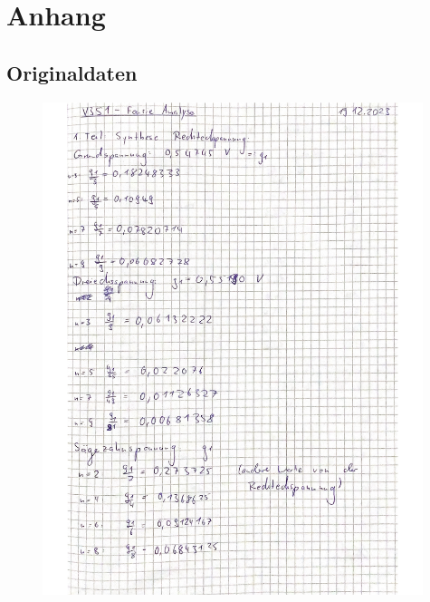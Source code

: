 \section{Anhang}
\label{sec:Anhang}
\subsection{Originaldaten}

 \begin{figure}[H]
   \centering
   \includegraphics[width=0.99\textwidth]{V351_Messwerte_1.pdf}
   \label{fig:Messungen_1}
 \end{figure}
